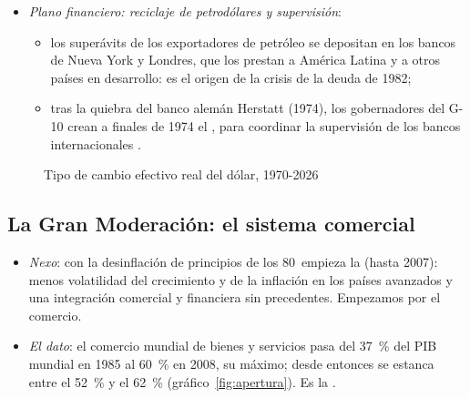 \documentclass[11pt]{article}
\begin{document}
\begin{itemize}
\begin{itemize}
{\begin{itemize}
    \item \emph{la segunda}: la revolución iraní (1979) y la guerra entre Irán e Irak (1980) multiplicaron de nuevo el precio, casi por 3~entre 1978 y 1981.
    \end{itemize}}
  \item los europeos buscan una isla de estabilidad: la serpiente y, en marzo de 1979, el Sistema Monetario Europeo (SME), con tipos centrales frente al ecu y bandas de fluctuación ;
  \item la cumbre del G-7 de Bonn (1978) ensaya la coordinación con la «locomotora» alemana y japonesa .
  \end{itemize}
\item \emph{Plano financiero: reciclaje de petrodólares y supervisión}:
  \begin{itemize}
  \item los superávits de los exportadores de petróleo se depositan en los bancos de Nueva York y Londres, que los prestan a América Latina y a otros países en desarrollo: es el origen de la crisis de la deuda de 1982;
  \item tras la quiebra del banco alemán Herstatt (1974), los gobernadores del G-10 crean a finales de 1974 el , para coordinar la supervisión de los bancos internacionales\nocite{BCBS2026Historia2} .
  \end{itemize}
\end{itemize}

\begin{figure}[H]
\centering
\caption{Tipo de cambio efectivo real del dólar, 1970-2026}\label{fig:dolar}
\end{figure}

\subsection{La Gran Moderación: el sistema comercial}\label{sec:comercial-moderacion}

\begin{itemize}
\item \emph{Nexo}: con la desinflación de principios de los 80~empieza la  (hasta 2007): menos volatilidad del crecimiento y de la inflación en los países avanzados y una integración comercial y financiera sin precedentes. Empezamos por el comercio.
\item \emph{El dato}: el comercio mundial de bienes y servicios pasa del 37~\% del PIB mundial en 1985 al 60~\% en 2008, su máximo; desde entonces se estanca entre el 52~\% y el 62~\% (gráfico~\ref{fig:apertura})\nocite{BM2026WDIComercio}. Es la .
\end{itemize}
\end{document}
